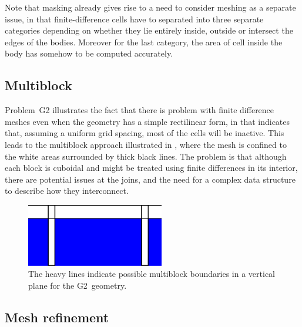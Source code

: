 Note that masking already gives rise to a need to consider meshing as a separate issue,
in that finite-difference cells have to separated into three separate categories depending on whether
they lie entirely inside, outside or intersect the edges of the bodies.  Moreover for the
last category, the area of cell inside the body has somehow to be computed accurately.

\clearpage
\subsection{Multiblock}\label{sec:multiblock}
Problem~G2 illustrates the fact that there is problem with finite difference
meshes even when the geometry has a simple rectilinear form, in that 
indicates that, assuming a uniform grid spacing, most of the cells will be inactive.
This leads to the multiblock approach illustrated in , where the mesh is
confined to the white areas surrounded by thick black lines. The problem is that
although each block is cuboidal and might be treated using finite differences in its
interior, there are potential issues at the joins, and the need for a complex data
structure to describe how they interconnect.
\begin{figure}
\centerline{\includegraphics[width=6cm]{../pics/vgapp}}
\caption{The heavy lines indicate possible multiblock boundaries in a vertical plane
for the G2~geometry.
\label{fig:vgapp}}
\end{figure}

\clearpage
\subsection{Mesh refinement}\label{sec:meshref}
